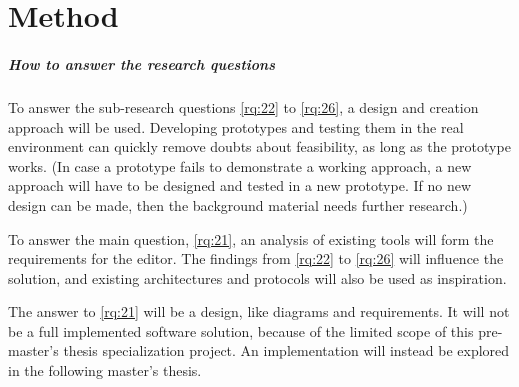 \chapter{Method}

\paragraph*{How to answer the research questions}
To answer the sub-research questions \cref{rq:22} to \cref{rq:26}, a design and creation approach will be used.
Developing prototypes and testing them in the real environment can quickly remove doubts about feasibility, as long as the prototype works.
(In case a prototype fails to demonstrate a working approach, a new approach will have to be designed and tested in a new prototype.
If no new design can be made, then the background material needs further research.)

To answer the main question, \cref{rq:21}, an analysis of existing tools will form the requirements for the editor.
The findings from \cref{rq:22} to \cref{rq:26} will influence the solution, and existing architectures and protocols will also be used as inspiration.

The answer to \cref{rq:21} will be a design, like diagrams and requirements.
It will not be a full implemented software solution, because of the limited scope of this pre-master's thesis specialization project.
An implementation will instead be explored in the following master's thesis.

